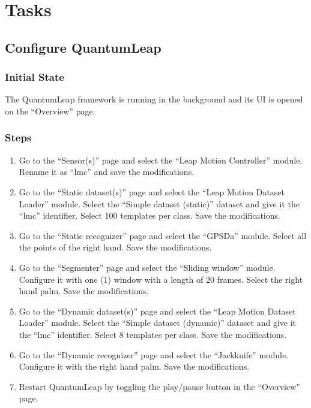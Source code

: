 \newpage
\chapter{Tasks} \label{app:quantumleap-tasks}
\section{Configure QuantumLeap} \label{app:quantumleap-tasks:tasks-config}
\subsection{Initial State}
The QuantumLeap framework is running in the background and its UI is opened on the ``Overview'' page.

{\sloppy
\subsection{Steps}
\begin{enumerate}
    \item Go to the ``Sensor(s)'' page and select the ``Leap Motion Controller'' module. Rename it as ``lmc'' and save the modifications.
    \item Go to the ``Static dataset(s)'' page and select the ``Leap Motion Dataset Loader'' module. Select the ``Simple dataset (static)'' dataset and give it the ``lmc'' identifier. Select 100 templates per class. Save the modifications.
    \item Go to the ``Static recognizer'' page and select the ``GPSDa'' module. Select all the points of the right hand. Save the modifications.
    \item Go to the ``Segmenter'' page and select the ``Sliding window'' module. Configure it with one (1) window with a length of 20 frames. Select the right hand palm. Save the modifications.
    \item Go to the ``Dynamic dataset(s)'' page and select the ``Leap Motion Dataset Loader'' module. Select the ``Simple dataset (dynamic)'' dataset and give it the ``lmc'' identifier. Select 8 templates per class. Save the modifications.
    \item Go to the ``Dynamic recognizer'' page and select the ``Jackknife'' module. Configure it with the right hand palm. Save the modifications.
    \item Restart QuantumLeap by toggling the play/pause button in the ``Overview'' page.
\end{enumerate}
}


